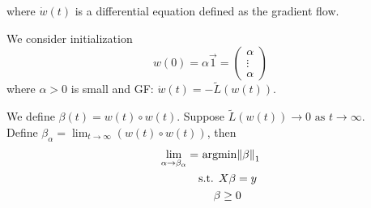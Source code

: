 where \(\dot{w}(t)\) is a differential equation defined as the gradient flow. 


\begin{theorem} 
    We consider initialization 
    \[
        w(0) = \alpha \vec{1} = \begin{pmatrix}
            \alpha \\ 
            \vdots \\ 
            \alpha
        \end{pmatrix}
    \]  where \(\alpha > 0\) is small and GF: \(\dot{w} (t) = - \tilde{L}\left( w(t) \right)\). 

    We define \(\beta(t) = w(t) \circ w(t)\).  
    Suppose \(\tilde{L}\left( w(t) \right) \to 0 \text{ as } t \to \infty\). \\ 

    Define \(\beta_\alpha = \lim_{t \to \infty} \left(w(t) \circ w(t) \right)\), then 
    \begin{align*}
        \lim_{\alpha \to \beta_\alpha} = &\text{ argmin} \norm{\beta}_1 \\ 
        &\text{s.t. } X\beta = y \\ 
        & \ \ \ \  \beta \geq 0 
    \end{align*}
\end{theorem}


